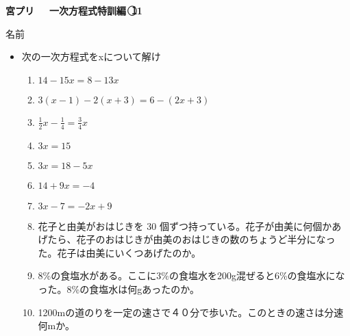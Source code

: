 \documentclass[a4paper,fleqn,papersize,15pt]{jsarticle}
\begin{document}
\clearpage
 \begin{center}
   \LARGE\textbf{宮プリ　~一次方程式特訓編~\textcircled{\scriptsize 11}}
     \begin{flushright}
       名前\underline{\hspace{8zw}}
     \end{flushright}
 \end{center}

 \begin{itemize}
   \item 次の一次方程式をxについて解け
   \begin{enumerate}
\item $14-15x=8-13x$ \begin{flushright}\framebox[8em]{\rule{0pt}{6ex}}\end{flushright} %
\item $3(x-1)-2(x+3)=6-(2x+3)$ \begin{flushright}\framebox[8em]{\rule{0pt}{6ex}}\end{flushright} %
\item $\frac{1}{2}x- \frac{1}{4} = \frac{3}{4} x$ \begin{flushright}\framebox[8em]{\rule{0pt}{6ex}}\end{flushright} %
\item $3x=15$ \begin{flushright}\framebox[8em]{\rule{0pt}{6ex}}\end{flushright} %
\item $3x=18-5x$ \begin{flushright}\framebox[8em]{\rule{0pt}{6ex}}\end{flushright} %
\item $14+9x=-4$ \begin{flushright}\framebox[8em]{\rule{0pt}{6ex}}\end{flushright} %
\item $3x-7=-2x+9$ \begin{flushright}\framebox[8em]{\rule{0pt}{6ex}}\end{flushright} %
\item 花子と由美がおはじきを 30 個ずつ持っている。花子が由美に何個かあげたら、花子のおはじきが由美のおはじきの数のちょうど半分になった。花子は由美にいくつあげたのか。 \vfill \begin{flushright}\framebox[8em]{\rule{0pt}{6ex}}\end{flushright} %
\item 8\%の食塩水がある。ここに3\%の食塩水を200g混ぜると6\%の食塩水になった。8\%の食塩水は何gあったのか。 \vfill \begin{flushright}\framebox[8em]{\rule{0pt}{6ex}}\end{flushright} %
\item 1200mの道のりを一定の速さで４０分で歩いた。このときの速さは分速何mか。 \vfill \begin{flushright}\framebox[8em]{\rule{0pt}{6ex}}\end{flushright} %
\end{enumerate}
    \vfill
\end{itemize}
\end{document}

